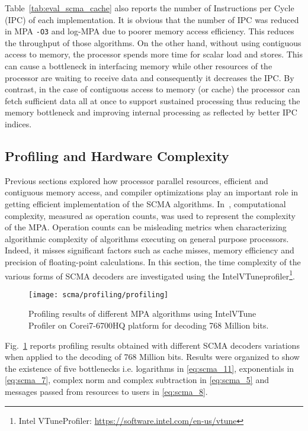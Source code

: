 Table~\ref{tab:eval_scma_cache} also reports the number of Instructions per
Cycle (IPC) of each implementation. It is obvious that the number of IPC was
reduced in MPA \verb|-O3| and log-MPA due to poorer memory access efficiency.
This reduces the throughput of those algorithms. On the other hand, without
using contiguous access to memory, the processor spends more time for scalar
load and stores. This can cause a bottleneck in interfacing memory while other
resources of the processor are waiting to receive data and consequently it
decreases the IPC. By contrast, in the case of contiguous access to memory (or
cache) the processor can fetch sufficient data all at once to support sustained
processing thus reducing the memory bottleneck and improving internal processing
as reflected by better IPC indices.

\subsection{Profiling and Hardware Complexity}
\label{sec:eval_scma_profiling}

Previous sections explored how processor parallel resources, efficient and
contiguous memory access, and compiler optimizations play an important role in
getting efficient implementation of the SCMA algorithms. In~\cite{Zhang2014a,
Liu2016,Jia2018,Du2016a}, computational complexity, measured as operation
counts, was used to represent the complexity of the MPA. Operation counts can be
misleading metrics when characterizing algorithmic complexity of algorithms
executing on general purpose processors. Indeed, it misses significant factors
such as cache misses, memory efficiency and precision of floating-point
calculations. In this section, the time complexity of the various forms of SCMA
decoders are investigated using the Intel\R VTune\TM profiler\footnote{Intel\R
VTune\TM Profiler: \url{https://software.intel.com/en-us/vtune}}.

\begin{figure}[htp]
  \centering
  \texttt{[image: scma/profiling/profiling]}
  \caption{Profiling results of different MPA algorithms using Intel\R VTune\TM
    Profiler on Core\TM i7-6700HQ platform for decoding 768 Million bits.}
  \label{plot:eval_scma_profiling}
\end{figure}

Fig.~\ref{plot:eval_scma_profiling} reports profiling results obtained with
different SCMA decoders variations when applied to the decoding of 768 Million
bits. Results were organized to show the existence of five bottlenecks i.e.
logarithms in \eqref{eq:scma_11}, exponentials in \eqref{eq:scma_7}, complex
norm and complex subtraction in \eqref{eq:scma_5} and messages passed from
resources to users in \eqref{eq:scma_8}.

